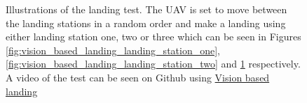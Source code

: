 \documentclass[../Head/report.tex]{subfiles}
\begin{document}
\begin{figure}[H]
\begin{subfigure}[t]{.30\textwidth}
        \caption{}
        \label{fig:vision_based_landing_landing_station_three}
    \end{subfigure}
    \caption{Illustrations of the landing test. The UAV is set to move between the landing stations in a random order and make a landing using either landing station one, two or three which can be seen in Figures \ref{fig:vision_based_landing_landing_station_one}, \ref{fig:vision_based_landing_landing_station_two} and \ref{fig:vision_based_landing_landing_station_three} respectively. A video of the test can be seen on Github using \href{https://github.com/Kenil16/master_project/tree/master/test_videos/vision_landing_precision_and_accuracy_vertical_vel_0.5_max_error_0.05}{Vision based landing}}
    \label{fig:vision_based_landing_landing_stations}
\end{figure}  
\end{document}
